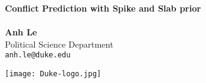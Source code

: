 \documentclass[a0,portrait]{a0poster}
\begin{document}


\begin{minipage}[b]{0.75\linewidth}
\veryHuge \color{NavyBlue} \textbf{Conflict Prediction with Spike and Slab prior} \color{Black}\\ %
\Huge\textit{}\\[2cm] %
\huge \textbf{Anh Le}\\[0.5cm] %
\huge Political Science Department\\[0.4cm] %
\Large \texttt{anh.le@duke.edu}\\
\end{minipage}
%
\begin{minipage}[b]{0.25\linewidth}
\texttt{[image: Duke-logo.jpg]}\\
\end{minipage}

\vspace{1cm} %

\end{document}
